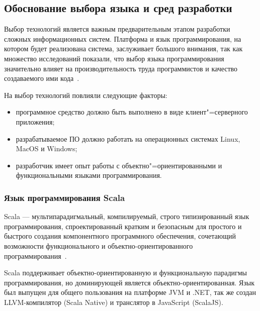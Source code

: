 \subsection{Обоснование выбора языка и сред разработки}
\label{sec:techs:intro}

Выбор технологий является важным предварительным этапом разработки сложных информационных систем. Платформа и язык программирования, на котором будет реализована система, заслуживает большого внимания, так как множество исследований показали, что выбор языка программирования значительно влияет на производительность труда программистов и качество создаваемого ими кода~\cite[c.~59]{mcconnell_2005}.

На выбор технологий повлияли следующие факторы:
\begin{itemize}
\item программное средство должно быть выполнено в виде клиент"=серверного приложения;
\item разрабатываемое ПО должно работать на операционных системах Linux, MacOS и Windows;
\item разработчик имеет опыт работы с объектно"=ориентированными и функциональными языками программирования.
\end{itemize}

\subsubsection{Язык программирования Scala}
\label{sub:techs:scala}
Scala — мультипарадигмальный, компилируемый, строго типизированный язык программирования, спроектированный кратким и безопасным для простого и быстрого создания компонентного программного обеспечения, сочетающий возможности функционального и объектно-ориентированного программирования~\cite{wiki_scala}.

Scala поддерживает объектно-ориентированную и функциональную парадигмы программирования, но доминирующей является объектно-ориентированная. Язык был выпущен для общего пользования на платформе JVM и .NET, так же создан LLVM-компилятор (Scala Native) и транслятор в JavaScript (ScalaJS).

